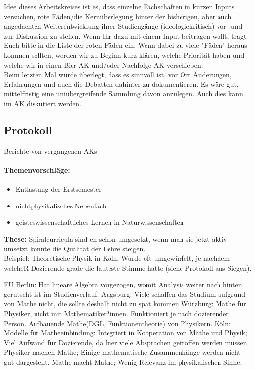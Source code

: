     Idee dieses Arbeitskreises ist es, dass einzelne Fachschaften in kurzen Inputs versuchen, rote Fäden/die Kernüberlegung hinter der bisherigen, aber auch angedachten Weiterentwicklung ihrer Studiengänge (ideologiekritisch) vor- und zur Diskussion zu stellen. Wenn Ihr dazu mit einem Input beitragen wollt, tragt Euch bitte in die Liste der roten Fäden ein. Wenn dabei zu viele "Fäden" heraus kommen sollten, werden wir zu Beginn kurz klären, welche Priorität haben und welche wir in einen Bier-AK und/oder Nachfolge-AK verschieben. \\

    Beim letzten Mal wurde überlegt, dass es sinnvoll ist, vor Ort Änderungen, Erfahrungen und auch die Debatten dahinter zu dokumentieren. Es wäre gut, mittelfristig eine uniübergreifende Sammlung davon anzulegen. Auch dies kann im AK diskutiert werden.

  \subsection*{Protokoll}
    Berichte von vergangenen AKs

    \paragraph{Themenvorschläge:}
      \begin{itemize}
        \item Entlastung der Erstsemester
        \item nichtphysikalisches Nebenfach
        \item geisteswissenschaftliches Lernen in Naturwissenschaften
      \end{itemize}

      \textbf{These:} Spiralcurricula sind eh schon umgesetzt, wenn man sie jetzt aktiv umsetzt könnte die Qualität der Lehre steigen. \\
      Beispiel: Theoretische Physik in Köln. Wurde oft umgewürfelt, je nachdem welcheR Dozierende grade die lauteste Stimme hatte (siehe Protokoll aus Siegen).

    \begin{outline}
      \1 FU Berlin: Hat lineare Algebra vorgezogen, womit Analysis weiter nach hinten gerutscht ist im Studienverlauf.
      \1 Augsburg: Viele schaffen das Studium aufgrund von Mathe nicht, die sollte deshalb nicht zu spät kommen
      \1 Würzbürg: Mathe für Physiker, nicht mit Mathematiker*innen. Funktioniert je nach dozierender Person. Aufbauende Mathe(DGL, Funktionentheorie) von Physikern.
      \1 Köln: Modelle für Matheeinbindung:
      \2 Integriert in Kooperation von Mathe und Physik; Viel Aufwand für Dozierende, da hier viele Absprachen getroffen werden müssen.
      \2 Physiker machen Mathe; Einige mathematische Zusammenhänge werden nicht gut dargestellt.
      \2 Mathe macht Mathe; Wenig Relevanz im physikalischen Sinne.
    \end{outline}

